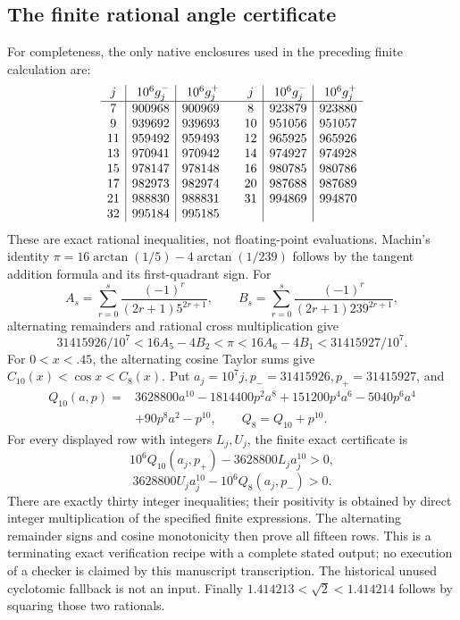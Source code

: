 \documentclass[11pt]{article}
\theoremstyle{definition}
\theoremstyle{remark}
\begin{document}
\subsection{The finite rational angle certificate}
\label{app:A18anglecertificate}
For completeness, the only native enclosures
used in the preceding finite calculation are:
\[
\begin{array}{c|r|r@{\qquad}c|r|r}
j&10^6g_j^-&10^6g_j^+&
j&10^6g_j^-&10^6g_j^+\\ \hline
7&900968&900969&8&923879&923880\\
9&939692&939693&10&951056&951057\\
11&959492&959493&12&965925&965926\\
13&970941&970942&14&974927&974928\\
15&978147&978148&16&980785&980786\\
17&982973&982974&20&987688&987689\\
21&988830&988831&31&994869&994870\\
32&995184&995185&&&
\end{array}
\]
These are exact rational inequalities, not
floating-point evaluations.
Machin's identity
\(\pi=16\arctan(1/5)-4\arctan(1/239)\)
follows by the tangent addition formula
and its first-quadrant sign.
For
\[
 A_s=\sum_{r=0}^s\frac{(-1)^r}{(2r+1)5^{2r+1}},
 \qquad
 B_s=\sum_{r=0}^s\frac{(-1)^r}{(2r+1)239^{2r+1}},
\]
alternating remainders and rational
cross multiplication give
\[
 31415926/10^7<16A_5-4B_2<\pi
 <16A_6-4B_1<31415927/10^7.
\]
For \(0<x<.45\), the alternating cosine
Taylor sums give \(C_{10}(x)<\cos x<C_8(x)\).
Put \(a_j=10^7j,p_-=31415926,p_+=31415927\), and
\[
\begin{split}
Q_{10}(a,p)={}&3628800a^{10}-1814400p^2a^8
 +151200p^4a^6-5040p^6a^4\\
 &+90p^8a^2-p^{10},\qquad Q_8=Q_{10}+p^{10}.
\end{split}
\]
For every displayed row with integers \(L_j,U_j\),
the finite exact certificate is
\[
 10^6Q_{10}(a_j,p_+)-3628800L_ja_j^{10}>0,
\]
\[
 3628800U_ja_j^{10}-10^6Q_8(a_j,p_-)>0.
\]
There are exactly thirty integer inequalities;
their positivity is obtained by direct
integer multiplication of the specified
finite expressions.
The alternating remainder signs and cosine
monotonicity then prove all fifteen rows.
This is a terminating exact verification
recipe with a complete stated output;
no execution of a checker is claimed by
this manuscript transcription.
The historical unused cyclotomic fallback
is not an input.
Finally \(1.414213<\sqrt2<1.414214\)
follows by squaring those two rationals.
\end{document}
